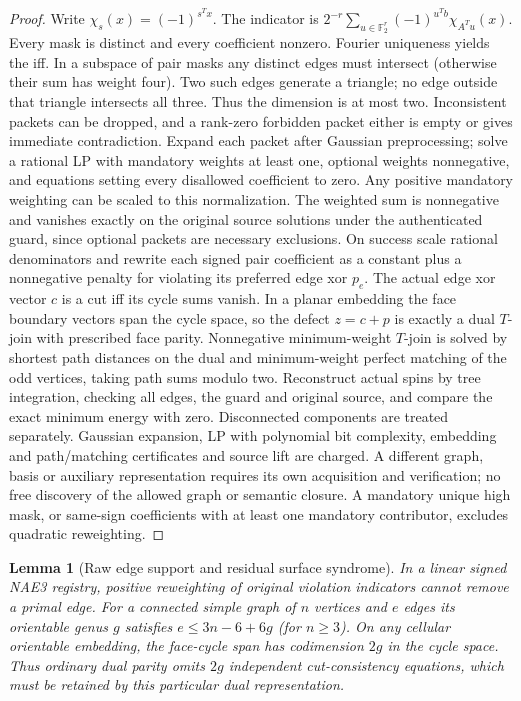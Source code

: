 \documentclass[11pt]{article}
\newtheorem{lemma}[theorem]{Lemma}
\begin{document}
\begin{proof}
Write $\chi_s(x)=(-1)^{s^Tx}$. The indicator is $2^{-r}\sum_{u\in\mathbb F_2^r}(-1)^{u^Tb}\chi_{A^Tu}(x)$. Every mask is distinct and every coefficient nonzero. Fourier uniqueness yields the iff. In a subspace of pair masks any distinct edges must intersect (otherwise their sum has weight four). Two such edges generate a triangle; no edge outside that triangle intersects all three. Thus the dimension is at most two. Inconsistent packets can be dropped, and a rank-zero forbidden packet either is empty or gives immediate contradiction.
Expand each packet after Gaussian preprocessing; solve a rational LP with mandatory weights at least one, optional weights nonnegative, and equations setting every disallowed coefficient to zero. Any positive mandatory weighting can be scaled to this normalization. The weighted sum is nonnegative and vanishes exactly on the original source solutions under the authenticated guard, since optional packets are necessary exclusions. On success scale rational denominators and rewrite each signed pair coefficient as a constant plus a nonnegative penalty for violating its preferred edge xor $p_e$. The actual edge xor vector $c$ is a cut iff its cycle sums vanish. In a planar embedding the face boundary vectors span the cycle space, so the defect $z=c+p$ is exactly a dual $T$-join with prescribed face parity. Nonnegative minimum-weight $T$-join is solved by shortest path distances on the dual and minimum-weight perfect matching of the odd vertices, taking path sums modulo two. Reconstruct actual spins by tree integration, checking all edges, the guard and original source, and compare the exact minimum energy with zero. Disconnected components are treated separately. Gaussian expansion, LP with polynomial bit complexity, embedding and path/matching certificates and source lift are charged. A different graph, basis or auxiliary representation requires its own acquisition and verification; no free discovery of the allowed graph or semantic closure. A mandatory unique high mask, or same-sign coefficients with at least one mandatory contributor, excludes quadratic reweighting.
\end{proof}
\begin{lemma}[Raw edge support and residual surface syndrome]\label{lem:m27-genus}
In a linear signed NAE3 registry, positive reweighting of original violation indicators cannot remove a primal edge. For a connected simple graph of $n$ vertices and $e$ edges its orientable genus $g$ satisfies $e\le3n-6+6g$ (for $n\ge3$). On any cellular orientable embedding, the face-cycle span has codimension $2g$ in the cycle space. Thus ordinary dual parity omits $2g$ independent cut-consistency equations, which must be retained by this particular dual representation.
\end{lemma}
\end{document}
